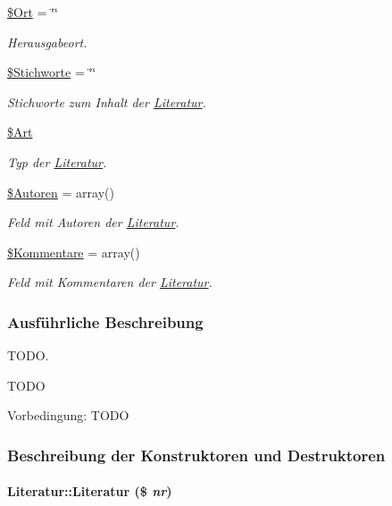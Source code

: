 \begin{CompactItemize}
\hyperlink{classLiteratur_da6c458bb229187efea8e8f144a1d279}{\$Ort} = \char`\"{}\char`\"{}
\begin{CompactList}\small\item\em Herausgabeort. \item\end{CompactList}\item 
\hyperlink{classLiteratur_aa77f0f697d4bcf72279aadedd91ddff}{\$Stichworte} = \char`\"{}\char`\"{}
\begin{CompactList}\small\item\em Stichworte zum Inhalt der \hyperlink{classLiteratur}{Literatur}. \item\end{CompactList}\item 
\hyperlink{classLiteratur_fb4d4b1ce29a33a10e3e27d47f31a447}{\$Art}
\begin{CompactList}\small\item\em Typ der \hyperlink{classLiteratur}{Literatur}. \item\end{CompactList}\item 
\hyperlink{classLiteratur_01b311917d78c1dbb346435598ebba64}{\$Autoren} = array()
\begin{CompactList}\small\item\em Feld mit Autoren der \hyperlink{classLiteratur}{Literatur}. \item\end{CompactList}\item 
\hyperlink{classLiteratur_ebcaeb5c38ce2677a14189da511fa663}{\$Kommentare} = array()
\begin{CompactList}\small\item\em Feld mit Kommentaren der \hyperlink{classLiteratur}{Literatur}. \item\end{CompactList}\end{CompactItemize}


\subsubsection{Ausf\"{u}hrliche Beschreibung}
TODO. 

TODO \begin{Desc}
\item[Vorbedingung:]TODO \end{Desc}




\subsubsection{Beschreibung der Konstruktoren und Destruktoren}
\hypertarget{classLiteratur_55626b912da4c041eaf981781ed6c640}{
\paragraph[Literatur]{\setlength{\rightskip}{0pt plus 5cm}Literatur::Literatur (\$ {\em nr})}\hfill}
\label{classLiteratur_55626b912da4c041eaf981781ed6c640}


